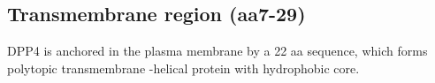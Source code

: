 \subsection{Transmembrane region (aa7-29)}

DPP4 is anchored in the plasma membrane by a 22 aa sequence, which forms polytopic transmembrane \alpha-helical protein with hydrophobic core.\cite{Hong_1990}